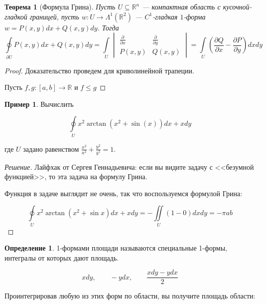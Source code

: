 \documentclass[a5paper]{article}
\newcounter{through}
\theoremstyle{plain}
\newtheorem{theorem}[through]{Теорема}
\theoremstyle{definition}
\newtheorem{definition}[through]{Определение}
\newtheorem{example}[through]{Пример}
\numberwithin{through}{section}
\numberwithin{equation}{section}
\begin{document}

\begin{theorem}[Формула Грина]
	Пусть $U \subseteq \mathbb{R}^n$ --- компактная область с кусочной-гладкой границей,
	пусть $w: U \to \Lambda^1(\mathbb{R}^2)$ --- $C^1$-гладкая $1$-форма $w = P(x,y)dx + Q(x,y)dy$. Тогда 
	\[ \oint\limits_{\partial U} P(x,y)dx + Q(x,y)dy = \int\limits_{U} 
	\begin{vmatrix}
	\frac{\partial}{\partial x} & \frac{\partial}{\partial y} \\
	P(x,y) & Q(x,y)
	\end{vmatrix} 
	= \int\limits_{U} \left(\frac{\partial Q}{\partial x} - \frac{\partial P}{\partial y} \right)dxdy \]
\end{theorem}

\begin{proof}
	Доказательство проведем для криволинейной трапеции.
	
	Пусть $f,g :[a,b] \to \mathbb{R}$ и $f\leq g$
\end{proof}

\begin{example}
	Вычислить
	
	\begin{equation*}
		\oint\limits_{U} x^2 \arctan(x^2+\sin(x))dx + xdy
	\end{equation*}
	
	где $U$ задано равенством $\frac{x^2}{a^2} + \frac{y^2}{b^2} = 1$.
\end{example}

\begin{proof}[Решение]
	Лайфхак от Сергея Геннадьевича: если вы видите задачу с <<безумной функцией>>, то эта задача на формулу Грина.
	
	Функция в задаче выглядит не очень, так что воспользуемся формулой Грина:
	
	\begin{equation*}
	\oint\limits_{U} x^2 \arctan(x^2+\sin x)dx + xdy = -\iint\limits_{U} (1 - 0) dxdy = -\pi ab
	\end{equation*}
\end{proof}

\begin{definition}
	1-формами площади называются специальные 1-формы, интегралы от которых дают площадь.
	
	\[
		xdy, \quad \quad -ydx, \quad \quad \frac{xdy-ydx}{2}
	\]
\end{definition}

Проинтегрировав любую из этих форм по области, вы получите площадь области:
\end{document}
